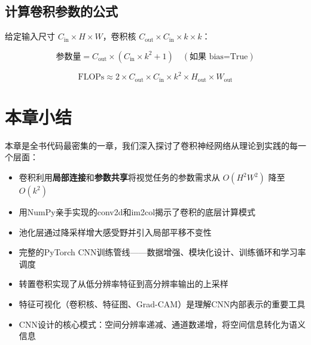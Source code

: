 \subsection{计算卷积参数的公式}

给定输入尺寸 $C_{\text{in}} \times H \times W$，卷积核 $C_{\text{out}} \times C_{\text{in}} \times k \times k$：

\[
\text{参数量} = C_{\text{out}} \times (C_{\text{in}} \times k^2 + 1) \quad (\text{如果 bias=True})
\]

\[
\text{FLOPs} \approx 2 \times C_{\text{out}} \times C_{\text{in}} \times k^2 \times H_{\text{out}} \times W_{\text{out}}
\]

\section{本章小结}

本章是全书代码最密集的一章，我们深入探讨了卷积神经网络从理论到实践的每一个层面：

\begin{itemize}
    \item 卷积利用\textbf{局部连接}和\textbf{参数共享}将视觉任务的参数需求从 $O(H^2W^2)$ 降至 $O(k^2)$
    \item 用NumPy亲手实现的conv2d和im2col揭示了卷积的底层计算模式
    \item 池化层通过降采样增大感受野并引入局部平移不变性
    \item 完整的PyTorch CNN训练管线——数据增强、模块化设计、训练循环和学习率调度
    \item 转置卷积实现了从低分辨率特征到高分辨率输出的上采样
    \item 特征可视化（卷积核、特征图、Grad-CAM）是理解CNN内部表示的重要工具
    \item CNN设计的核心模式：空间分辨率递减、通道数递增，将空间信息转化为语义信息
\end{itemize}
